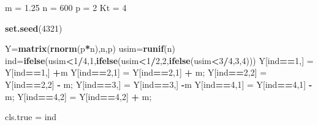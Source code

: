 \documentclass[
]{article}
\newenvironment{Shaded}{\begin{snugshade}}{\end{snugshade}}
\newcommand{\DecValTok}[1]{\textcolor[rgb]{0.00,0.00,0.81}{#1}}
\newcommand{\FloatTok}[1]{\textcolor[rgb]{0.00,0.00,0.81}{#1}}
\newcommand{\FunctionTok}[1]{\textcolor[rgb]{0.13,0.29,0.53}{\textbf{#1}}}
\newcommand{\NormalTok}[1]{#1}
\newcommand{\OtherTok}[1]{\textcolor[rgb]{0.56,0.35,0.01}{#1}}
\newcommand{\SpecialCharTok}[1]{\textcolor[rgb]{0.81,0.36,0.00}{\textbf{#1}}}
\begin{document}
\begin{Shaded}
\begin{Highlighting}[]
\NormalTok{m }\OtherTok{=} \FloatTok{1.25}
\NormalTok{n }\OtherTok{=} \DecValTok{600}
\NormalTok{p }\OtherTok{=} \DecValTok{2}
\NormalTok{Kt }\OtherTok{=} \DecValTok{4}

\FunctionTok{set.seed}\NormalTok{(}\DecValTok{4321}\NormalTok{)}

\NormalTok{Y}\OtherTok{=}\FunctionTok{matrix}\NormalTok{(}\FunctionTok{rnorm}\NormalTok{(p}\SpecialCharTok{*}\NormalTok{n),n,p)}
\NormalTok{usim}\OtherTok{=}\FunctionTok{runif}\NormalTok{(n)}
\NormalTok{ind}\OtherTok{=}\FunctionTok{ifelse}\NormalTok{(usim}\SpecialCharTok{\textless{}}\DecValTok{1}\SpecialCharTok{/}\DecValTok{4}\NormalTok{,}\DecValTok{1}\NormalTok{,}\FunctionTok{ifelse}\NormalTok{(usim}\SpecialCharTok{\textless{}}\DecValTok{1}\SpecialCharTok{/}\DecValTok{2}\NormalTok{,}\DecValTok{2}\NormalTok{,}\FunctionTok{ifelse}\NormalTok{(usim}\SpecialCharTok{\textless{}}\DecValTok{3}\SpecialCharTok{/}\DecValTok{4}\NormalTok{,}\DecValTok{3}\NormalTok{,}\DecValTok{4}\NormalTok{)))}
\NormalTok{Y[ind}\SpecialCharTok{==}\DecValTok{1}\NormalTok{,] }\OtherTok{=}\NormalTok{ Y[ind}\SpecialCharTok{==}\DecValTok{1}\NormalTok{,] }\SpecialCharTok{+}\NormalTok{m}
\NormalTok{Y[ind}\SpecialCharTok{==}\DecValTok{2}\NormalTok{,}\DecValTok{1}\NormalTok{] }\OtherTok{=}\NormalTok{ Y[ind}\SpecialCharTok{==}\DecValTok{2}\NormalTok{,}\DecValTok{1}\NormalTok{] }\SpecialCharTok{+}\NormalTok{ m; Y[ind}\SpecialCharTok{==}\DecValTok{2}\NormalTok{,}\DecValTok{2}\NormalTok{] }\OtherTok{=}\NormalTok{ Y[ind}\SpecialCharTok{==}\DecValTok{2}\NormalTok{,}\DecValTok{2}\NormalTok{] }\SpecialCharTok{{-}}\NormalTok{ m;}
\NormalTok{Y[ind}\SpecialCharTok{==}\DecValTok{3}\NormalTok{,] }\OtherTok{=}\NormalTok{ Y[ind}\SpecialCharTok{==}\DecValTok{3}\NormalTok{,] }\SpecialCharTok{{-}}\NormalTok{m}
\NormalTok{Y[ind}\SpecialCharTok{==}\DecValTok{4}\NormalTok{,}\DecValTok{1}\NormalTok{] }\OtherTok{=}\NormalTok{ Y[ind}\SpecialCharTok{==}\DecValTok{4}\NormalTok{,}\DecValTok{1}\NormalTok{] }\SpecialCharTok{{-}}\NormalTok{ m; Y[ind}\SpecialCharTok{==}\DecValTok{4}\NormalTok{,}\DecValTok{2}\NormalTok{] }\OtherTok{=}\NormalTok{ Y[ind}\SpecialCharTok{==}\DecValTok{4}\NormalTok{,}\DecValTok{2}\NormalTok{] }\SpecialCharTok{+}\NormalTok{ m;}

\NormalTok{cls.true }\OtherTok{=}\NormalTok{ ind}
\end{Highlighting}
\end{Shaded}
\end{document}
